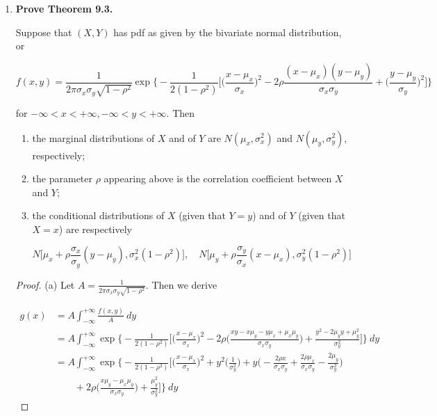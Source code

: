 \documentclass[10pt, oneside]{article}
\begin{document}
\begin{enumerate}[label=9.\arabic*]
Lastly,

\begin{align*}
V[X] &= E[X^2] - E[X]^2 \\
&= \frac{r(r+1)}{\alpha^2} - \frac{r^2}{\alpha^2} = \boxed{\frac{r}{\alpha^2}}
\end{align*}

\item  \begin{tcolorbox}[
  colback=Cerulean!5!white,
  colframe=Cerulean!75!black]
\textbf{Prove Theorem 9.3.}
\end{tcolorbox}

\begin{thm}
Suppose that $(X,Y)$ has pdf as given by the bivariate normal distribution, or

\[ f(x,y) = \frac{1}{2\pi \sigma_x \sigma_y \sqrt{1-\rho^2}} \exp \bigg\{ -\frac{1}{2(1-\rho^2)} \bigg[ \bigg( \frac{x - \mu_x}{\sigma_x} \bigg)^2 - 2\rho \frac{(x - \mu_x)(y - \mu_y)}{\sigma_x \sigma_y} + \bigg( \frac{y - \mu_y}{\sigma_y} \bigg)^2 \bigg] \bigg\}  \]

for $-\infty < x < +\infty, -\infty < y < +\infty$. Then

\begin{enumerate}
\item the marginal distributions of $X$ and of $Y$ are $N(\mu_x, \sigma^2_x)$ and $N(\mu_y, \sigma^2_y)$, respectively; 
\item the parameter $\rho$ appearing above is the correlation coefficient between $X$ and $Y$;
\item the conditional distributions of $X$ (given that $Y = y$) and of $Y$ (given that $X = x$) are respectively

\[ N \bigg[ \mu_x + \rho \frac{\sigma_x}{\sigma_y} (y - \mu_y), \sigma^2_x (1 - \rho^2) \bigg], \quad N \bigg[ \mu_y + \rho \frac{\sigma_y}{\sigma_x} (x - \mu_x), \sigma^2_y (1 - \rho^2) \bigg]  \]
\end{enumerate}
\end{thm}

\begin{proof}
(a) Let $A = \frac{1}{2\pi \sigma_x \sigma_y \sqrt{1-\rho^2}}$. Then we derive

\begin{align*}
g(x) &= A \int^{+\infty}_{-\infty} \frac{f(x,y)}{A} \ dy \\
&= A \int^{+\infty}_{-\infty} \exp \bigg\{ -\frac{1}{2(1 - \rho^2)} \bigg[ \bigg( \frac{x - \mu_x}{\sigma_x} \bigg)^2 - 2\rho \bigg( \frac{xy - x\mu_y - y \mu_x + \mu_x \mu_y}{\sigma_x \sigma_y} \bigg) + \frac{y^2 - 2\mu_y y + \mu^2_y}{\sigma^2_y} \bigg] \bigg\} \ dy \\
&= A \int^{+\infty}_{-\infty} \exp \bigg\{ -\frac{1}{2(1-\rho^2)} \bigg[ \bigg( \frac{x - \mu_x}{\sigma_x} \bigg)^2 + y^2 \bigg( \frac{1}{\sigma^2_y} \bigg) + y \bigg( -\frac{2\rho x}{\sigma_x \sigma_y} + \frac{2\rho \mu_x}{\sigma_x \sigma_y} - \frac{2\mu_y}{\sigma^2_y} \bigg)  \\
&\quad \quad + 2\rho \bigg( \frac{x \mu_y - \mu_x \mu_y}{\sigma_x \sigma_y} \bigg) + \frac{\mu^2_y}{\sigma^2_y} \bigg] \bigg\} \ dy
\end{align*}


\end{proof}
\end{enumerate}
\end{document}
